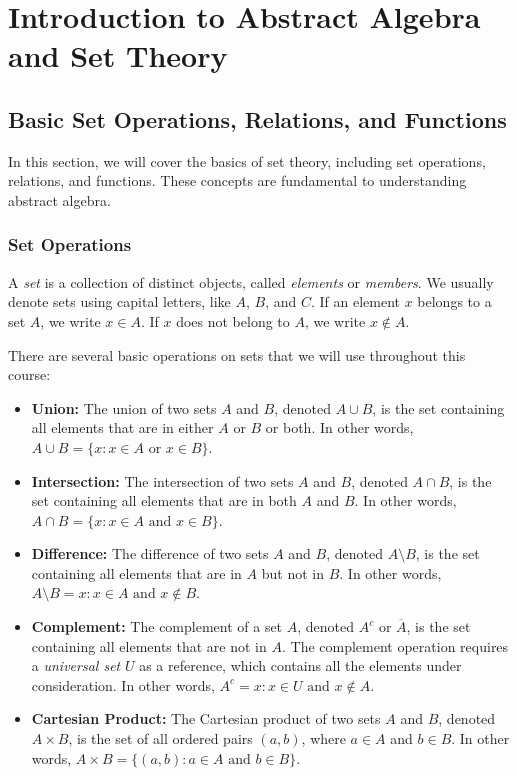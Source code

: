 
\chapter{Introduction to Abstract Algebra and Set Theory}

\section{Basic Set Operations, Relations, and Functions}

In this section, we will cover the basics of set theory, including set operations, relations, and functions. These concepts are fundamental to understanding abstract algebra.

\subsection{Set Operations}

A \textit{set} is a collection of distinct objects, called \textit{elements} or \textit{members}. We usually denote sets using capital letters, like $A$, $B$, and $C$. If an element $x$ belongs to a set $A$, we write $x \in A$. If $x$ does not belong to $A$, we write $x \notin A$.

There are several basic operations on sets that we will use throughout this course:

\begin{itemize} 

\item \textbf{Union:} The union of two sets $A$ and $B$, denoted $A \cup B$, is the set containing all elements that are in either $A$ or $B$ or both. In other words, $A \cup B = \{x:x \in A \text{ or } x \in B\}$. 

    \item \textbf{Intersection:} The intersection of two sets $A$ and $B$, denoted $A \cap B$, is the set containing all elements that are in both $A$ and $B$. In other words, $A \cap B = \{x:x \in A \text{ and } x \in B\}$.

    \item \textbf{Difference:} The difference of two sets $A$ and $B$, denoted $A \setminus B$, is the set containing all elements that are in $A$ but not in $B$. In other words, $A \setminus B = {x:x \in A \text{ and } x \notin B}$. 

    \item \textbf{Complement:} The complement of a set $A$, denoted $A^c$ or $\overline{A}$, is the set containing all elements that are not in $A$. The complement operation requires a \textit{universal set} $U$ as a reference, which contains all the elements under consideration. In other words, $A^c ={x:x \in U \text{ and } x \notin A}$.

    \item \textbf{Cartesian Product:} The Cartesian product of two sets $A$ and $B$, denoted $A \times B$, is the set of all ordered pairs $(a, b)$, where $a \in A$ and $b \in B$. In other words, $A \times B = \{(a,b):a \in A \text{ and } b \in B\}$. 

\end{itemize}

